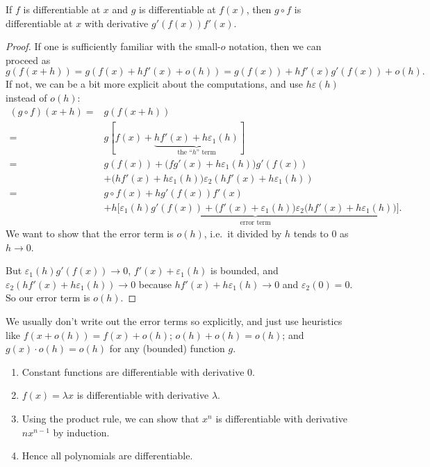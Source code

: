 \documentclass[a4paper]{article}
\begin{document}
\begin{lemma}
  If $f$ is differentiable at $x$ and $g$ is differentiable at $f(x)$, then $g\circ f$ is differentiable at $x$ with derivative $g'(f(x))f'(x)$.
\end{lemma}
\begin{proof}
  If one is sufficiently familiar with the small-$o$ notation, then we can proceed as
  \[
    g(f(x + h)) = g(f(x) + h f'(x) + o(h)) = g(f(x)) + h f'(x) g'(f(x)) + o(h).
  \]
  If not, we can be a bit more explicit about the computations, and use $h\varepsilon(h)$ instead of $o(h)$:
  \begin{align*}
    (g\circ f)(x + h) ={}& g(f(x + h))\\
    ={}& g[f(x) + \underbrace{hf'(x) + h\varepsilon_1(h)}_{\text{the ``}h\text{'' term}}]\\
    ={}& g(f(x)) + \big(fg'(x) + h\varepsilon_1(h)\big)g'(f(x))\\
    &+ \big(hf'(x) + h\varepsilon_1(h)\big)\varepsilon_2(hf'(x) + h\varepsilon_1(h))\\
    ={}& g\circ f(x) + hg'(f(x))f'(x)\\
    &+ \underbrace{h\Big[\varepsilon_1(h)g'(f(x)) + \big(f'(x) + \varepsilon_1(h)\big)\varepsilon_2\big(hf'(x) + h\varepsilon_1(h)\big)\Big]}_{\text{error term}}.
  \end{align*}
  We want to show that the error term is $o(h)$, i.e.\ it divided by $h$ tends to $0$ as $h\to 0$.

  But $\varepsilon_1(h)g'(f(x))\to 0$, $f'(x) + \varepsilon_1(h)$ is bounded, and $\varepsilon_2(hf'(x) + h\varepsilon_1(h))\to 0$ because $hf'(x) + h\varepsilon_1(h) \to 0$ and $\varepsilon_2(0) = 0$. So our error term is $o(h)$.
\end{proof}

We usually don't write out the error terms so explicitly, and just use heuristics like $f(x + o(h)) = f(x) + o(h)$; $o(h) + o(h) = o(h)$; and $g(x) \cdot o(h) = o(h)$ for any (bounded) function $g$.

\begin{eg}\leavevmode
  \begin{enumerate}
    \item Constant functions are differentiable with derivative $0$.
    \item $f(x) = \lambda x$ is differentiable with derivative $\lambda$.
    \item Using the product rule, we can show that $x^n$ is differentiable with derivative $nx^{n - 1}$ by induction.
    \item Hence all polynomials are differentiable.
  \end{enumerate}
\end{eg}
\end{document}
